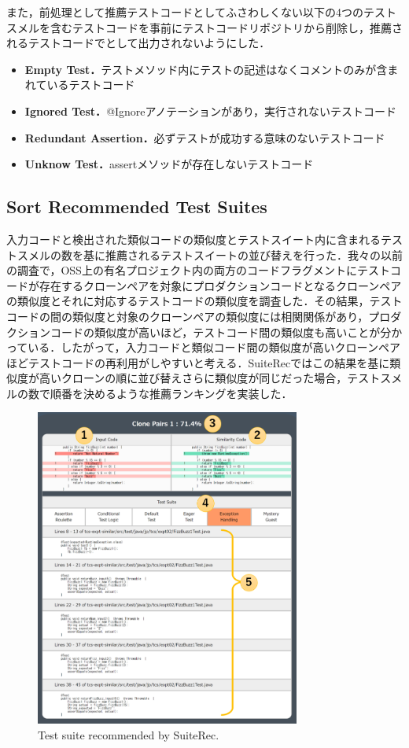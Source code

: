 \documentclass[conference]{IEEEtran}
\begin{document}
また，前処理として推薦テストコードとしてふさわしくない以下の4つのテストスメルを含むテストコードを事前にテストコードリポジトリから削除し，推薦されるテストコードでとして出力されないようにした．　

\begin{itemize}
\item \textbf{Empty Test．}テストメソッド内にテストの記述はなくコメントのみが含まれているテストコード
\item \textbf{Ignored Test．}@Ignoreアノテーションがあり，実行されないテストコード
\item \textbf{Redundant Assertion．}必ずテストが成功する意味のないテストコード
\item \textbf{Unknow Test．}assertメソッドが存在しないテストコード
\end{itemize}

\subsection{Sort Recommended Test Suites}
入力コードと検出された類似コードの類似度とテストスイート内に含まれるテストスメルの数を基に推薦されるテストスイートの並び替えを行った．我々の以前の調査で，OSS上の有名プロジェクト内の両方のコードフラグメントにテストコードが存在するクローンペアを対象にプロダクションコードとなるクローンペアの類似度とそれに対応するテストコードの類似度を調査した．その結果，テストコードの間の類似度と対象のクローンペアの類似度には相関関係があり，プロダクションコードの類似度が高いほど，テストコード間の類似度も高いことが分かっている．したがって，入力コードと類似コード間の類似度が高いクローンペアほどテストコードの再利用がしやすいと考える．SuiteRecではこの結果を基に類似度が高いクローンの順に並び替えさらに類似度が同じだった場合，テストスメルの数で順番を決めるような推薦ランキングを実装した．

\begin{figure}[htbp]
\centerline{\includegraphics[width=8.7cm]{SuiteRec.pdf}}
\caption{Test suite recommended by SuiteRec.}
\label{fig}
\end{figure}
\end{document}
